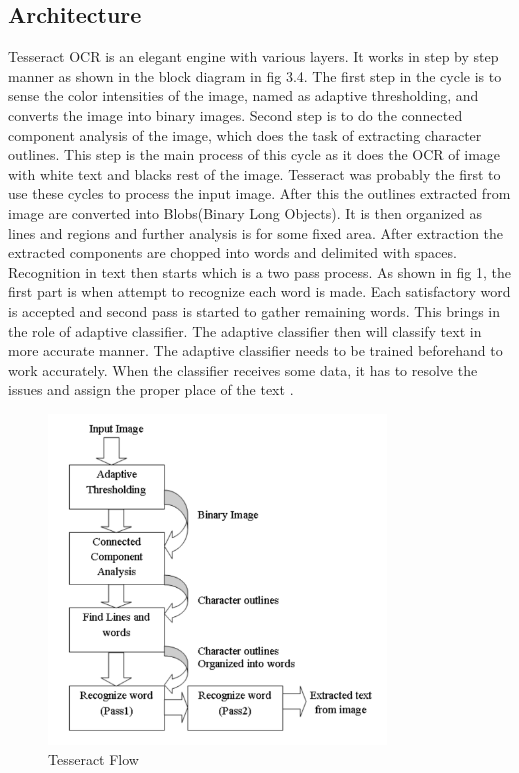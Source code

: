 \subsection{Architecture}
Tesseract OCR is an elegant engine with various layers. It works in step by step manner as
shown in the block diagram in fig 3.4. The first step in the cycle is to sense the color intensities of the image, named as adaptive thresholding, and converts the image into binary images.
Second step is to do the connected component analysis of the image, which does the task of
extracting character outlines. This step is the main process of this cycle as it does the OCR of
image with white text and blacks rest of the image.
Tesseract was probably the first to use these cycles to process the input image. After this the
outlines extracted from image are converted into Blobs(Binary Long Objects). It is then organized as lines and regions and further analysis is for some fixed area. After extraction
the extracted components are chopped into words and delimited with spaces. Recognition in text
then starts which is a two pass process. As shown in fig 1, the first part is when attempt to
recognize each word is made. Each satisfactory word is accepted and second pass is started to
gather remaining words. This brings in the role of adaptive classifier. The adaptive classifier then will classify text in more accurate manner. The adaptive classifier needs to be trained beforehand
to work accurately. When the classifier receives some data, it has to resolve the issues and assign
the proper place of the text\cite{TesseractORCEngine} \cite{TesseractORCEngine2}.

\begin{figure}[H]
\centering
\label{flow} 
\includegraphics[width=0.8\textwidth]{tesseractFlow}
\caption {Tesseract Flow}
\end{figure}

